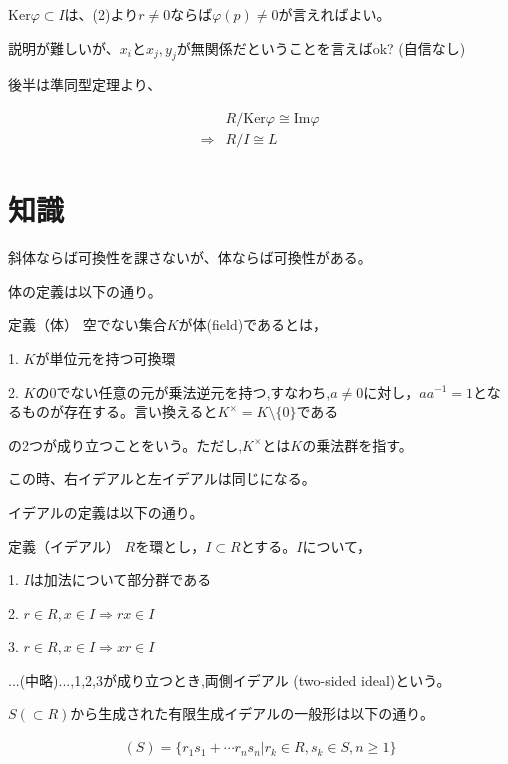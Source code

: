 \documentclass[a4paper, 10pt, dvipdfmx]{jlreq}
\begin{document}
$\mathrm{Ker}\varphi \subset I$は、(2)より$r\neq 0$ならば$\varphi(p) \neq 0$が言えればよい。

説明が難しいが、$x_i$と$x_j,y_j$が無関係だということを言えばok? (自信なし)

後半は準同型定理より、

\begin{align*}
              & R/\mathrm{Ker}{\varphi} \cong \mathrm{Im}{\varphi} \\
  \Rightarrow & R/I \cong L
\end{align*}

\section{知識}

斜体ならば可換性を課さないが、体ならば可換性がある。

体の定義は以下の通り。

\begin{itembox}[l]{ 定義（体）}
  空でない集合$K$が体(field)であるとは，

  1. $K$が単位元を持つ可換環

  2. $K$の0でない任意の元が乗法逆元を持つ,すなわち,$a \neq 0$に対し，$aa^{-1}=1$となるものが存在する。言い換えると$K^{\times}=K\setminus\{0\}$である

  の2つが成り立つことをいう。ただし,$K^{\times}$とは$K$の乗法群を指す。
\end{itembox}

この時、右イデアルと左イデアルは同じになる。

イデアルの定義は以下の通り。

\begin{itembox}[l]{ 定義（イデアル）}
  $R$を環とし，$I \subset R$とする。$I$について，

  1. $I$は加法について部分群である

  2. $r \in R, x \in I \Rightarrow rx \in I$

  3. $r \in R, x \in I \Rightarrow xr \in I$

  ...(中略)...,1,2,3が成り立つとき,両側イデアル (two-sided ideal)という。
\end{itembox}

$S (\subset R)$から生成された有限生成イデアルの一般形は以下の通り。

\begin{align*}
  (S)=\{r_1s_1+\cdots r_ns_n | r_k \in R, s_k \in S, n \geq 1 \}
\end{align*}
\end{document}
